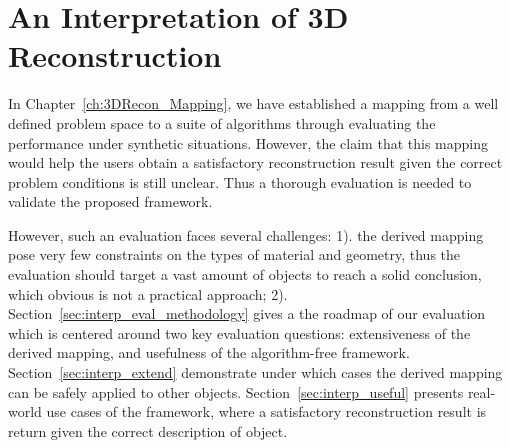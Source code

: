 
\chapter{An Interpretation of 3D Reconstruction}
\label{ch:3DRecon_Interp}
In Chapter~\ref{ch:3DRecon_Mapping}, we have established a mapping from a well defined problem space to a suite of algorithms through evaluating the performance under synthetic situations. However, the claim that this mapping would help the users obtain a satisfactory reconstruction result given the correct problem conditions is still unclear. Thus a thorough evaluation is needed to validate the proposed framework.

However, such an evaluation faces several challenges: 1). the derived mapping pose very few constraints on the types of material and geometry, thus the evaluation should target a vast amount of objects to reach a solid conclusion, which obvious is not a practical approach; 2). Section~\ref{sec:interp_eval_methodology} gives a the roadmap of our evaluation which is centered around two key evaluation questions: extensiveness of the derived mapping, and usefulness of the algorithm-free framework. Section~\ref{sec:interp_extend} demonstrate under which cases the derived mapping can be safely applied to other objects. Section~\ref{sec:interp_useful} presents real-world use cases of the framework, where a satisfactory reconstruction result is return given the correct description of object.



